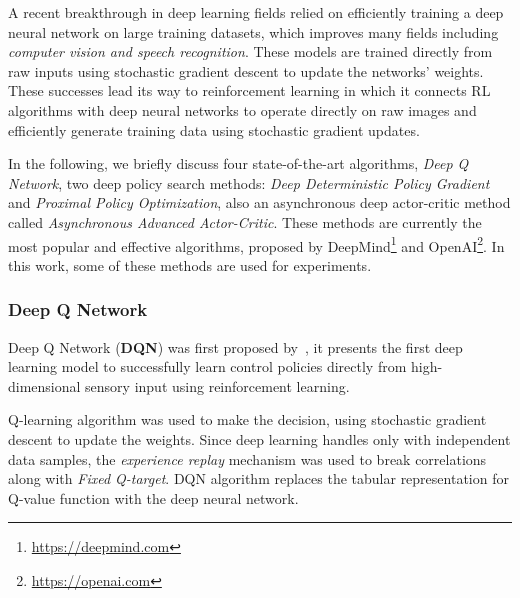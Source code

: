 A recent breakthrough in deep learning fields relied on efficiently training a deep neural network on large training datasets, which improves many fields including \textit{computer vision and speech recognition}. These models are trained directly from raw inputs using stochastic gradient descent to update the networks' weights. These successes lead its way to reinforcement learning in which it connects RL algorithms with deep neural networks to operate directly on raw images and efficiently generate training data using stochastic gradient updates.

In the following, we briefly discuss four state-of-the-art algorithms, \textit{Deep Q Network}, two deep policy search methods: \textit{Deep Deterministic Policy Gradient} and \textit{Proximal Policy Optimization}, also an asynchronous deep actor-critic method called \textit{Asynchronous Advanced Actor-Critic}.
These methods are currently the most popular and effective algorithms, proposed by DeepMind\footnote{\url{https://deepmind.com}} and OpenAI\footnote{\url{https://openai.com}}. In this work, some of these methods are used for experiments.

\subsubsection{Deep Q Network}
Deep Q Network (\textbf{DQN}) was first proposed by~\parencite{mnih2013playing}, it presents the first deep learning model to successfully learn control policies directly from high-dimensional sensory input using reinforcement learning.

Q-learning algorithm was used to make the decision, using stochastic gradient descent to update the weights. Since deep learning handles only with independent data samples, the \textit{experience replay} mechanism was used to break correlations along with \textit{Fixed Q-target}. DQN algorithm replaces the tabular representation for Q-value function with the deep neural network.

